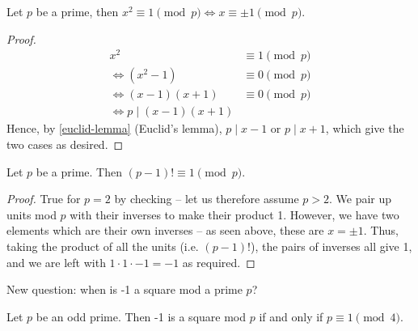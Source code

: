 \documentclass{../template/note}
\begin{document}
    \begin{lemma}
        Let \(p\) be a prime, then \(x^2 \equiv 1 \pmod p \iff x \equiv \pm 1 \pmod p\).
    \end{lemma}
    
    \begin{proof}
        \begin{align*}
            x^2 &\equiv 1 \pmod p \\
            \iff (x^2-1) &\equiv 0 \pmod p \\
            \iff (x-1)(x+1) &\equiv 0 \pmod p \\
            \iff p \mid (x-1)(x+1)
        \end{align*}
        Hence, by \cref{euclid-lemma} (Euclid's lemma), \(p \mid x-1\) or \(p \mid x+1\), which give the two cases as desired.
    \end{proof}
    

    \begin{theorem}[Wilson]
        Let \(p\) be a prime. Then \((p-1)! \equiv 1 \pmod p\).
    \end{theorem}
    
    \begin{proof}
        True for \(p = 2\) by checking -- let us therefore assume \(p > 2\). We pair up units mod \(p\) with their inverses to make their product 1. However, we have two elements which are their own inverses -- as seen above, these are \(x = \pm 1\). Thus, taking the product of all the units (i.e. \((p-1)!\)), the pairs of inverses all give 1, and we are left with \(1 \cdot 1 \cdot -1 = -1\) as required.
    \end{proof}
    
    New question: when is -1 a square mod a prime \(p\)?

    \begin{proposition}
        Let \(p\) be an odd prime. Then -1 is a square mod \(p\) if and only if \(p \equiv 1 \pmod 4\).
    \end{proposition}
    
\end{document}
